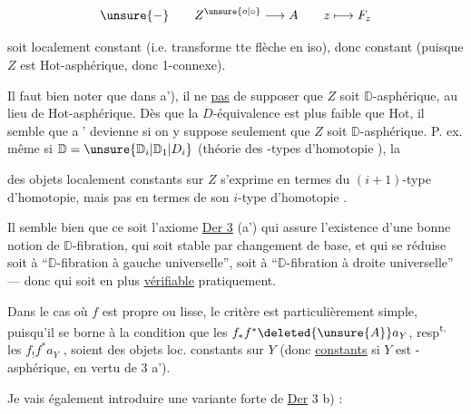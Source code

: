 \[
\unsure{\relbar}\qquad Z^{\unsure{o|\circ}}\longrightarrow A\qquad z\longmapsto F_z
\]

soit localement constant (i.e. transforme tte flèche en iso), donc  constant (puisque $Z$ est $\mathrm{Hot}$-asphérique, donc 1-connexe).

Il faut bien noter que dans a'), il ne  \uline{pas} de supposer que $Z$ soit $\mathbb D$-asphérique, au lieu de $\mathrm{Hot}$-asphérique. Dès que la $D$-équivalence est  plus faible que $\mathrm{Hot}$, il semble que \textcircled{\scriptsize a'} devienne    si on y  suppose seulement que $Z$ soit $\mathbb D$-asphérique. P. ex. même si $\mathbb D=\unsure{\mathbb D_i|\mathbb D_1|D_i}$ (théorie des -types d'homotopie ), la  



des objets localement constants sur $Z$ s'exprime en termes du $(i+1)$-type d'homotopie, mais pas en termes de son $i$-type d'homotopie .

Il semble bien que ce soit l'axiome \uline{Der 3} (a') qui assure l'existence d'une bonne notion  de $\mathbb D$-fibration, qui soit stable par changement de base, et qui se réduise soit à ``$\mathbb D$-fibration à gauche universelle'', soit à ``$\mathbb D$-fibration à droite universelle'' --- donc qui soit en plus  \uline{vérifiable} pratiquement.

Dans le cas où $f$ est propre ou lisse, le critère est particulièrement simple, puisqu'il se borne à la condition que  les $f_*f^*\deleted{\unsure{A}}a_Y$, resp\textsuperscript{t.} les $f_!f^*a_Y$ , soient des objets loc. constants sur $Y$ (donc \uline{constants} si $Y$ est -asphérique, en vertu de  3 a').

Je vais également introduire une variante  forte de \uline{Der} 3 b) :


